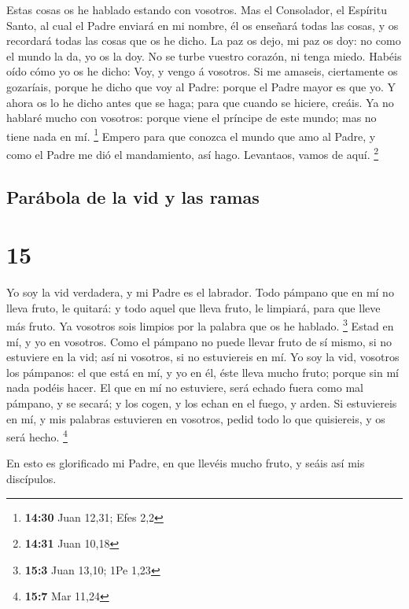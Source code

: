  Estas cosas os he hablado estando con vosotros.
 Mas el Consolador, el Espíritu Santo, al cual el Padre
enviará en mi nombre, él os enseñará todas las cosas, y os recordará
todas las cosas que os he dicho.  La paz os dejo, mi paz os
doy: no como el mundo la da, yo os la doy. No se turbe vuestro corazón,
ni tenga miedo.  Habéis oído cómo yo os he dicho: Voy, y
vengo á vosotros. Si me amaseis, ciertamente os gozaríais, porque he
dicho que voy al Padre: porque el Padre mayor es que yo.  Y
ahora os lo he dicho antes que se haga; para que cuando se hiciere,
creáis.  Ya no hablaré mucho con vosotros: porque viene el
príncipe de este mundo; mas no tiene nada en mí. \footnote{\textbf{14:30}
  Juan 12,31; Efes 2,2}  Empero para que conozca el mundo
que amo al Padre, y como el Padre me dió el mandamiento, así hago.
Levantaos, vamos de aquí. \footnote{\textbf{14:31} Juan 10,18}

\hypertarget{paruxe1bola-de-la-vid-y-las-ramas}{%
\subsection{Parábola de la vid y las
ramas}\label{paruxe1bola-de-la-vid-y-las-ramas}}

\hypertarget{section-14}{%
\section{15}\label{section-14}}

 Yo soy la vid verdadera, y mi Padre es el labrador.
 Todo pámpano que en mí no lleva fruto, le quitará: y todo
aquel que lleva fruto, le limpiará, para que lleve más fruto.
 Ya vosotros sois limpios por la palabra que os he hablado.
\footnote{\textbf{15:3} Juan 13,10; 1Pe 1,23}  Estad en mí,
y yo en vosotros. Como el pámpano no puede llevar fruto de sí mismo, si
no estuviere en la vid; así ni vosotros, si no estuviereis en mí.
 Yo soy la vid, vosotros los pámpanos: el que está en mí, y
yo en él, éste lleva mucho fruto; porque sin mí nada podéis hacer.
 El que en mí no estuviere, será echado fuera como mal
pámpano, y se secará; y los cogen, y los echan en el fuego, y arden.
 Si estuviereis en mí, y mis palabras estuvieren en
vosotros, pedid todo lo que quisiereis, y os será hecho. \footnote{\textbf{15:7}
  Mar 11,24}

 En esto es glorificado mi Padre, en que llevéis mucho
fruto, y seáis así mis discípulos.

